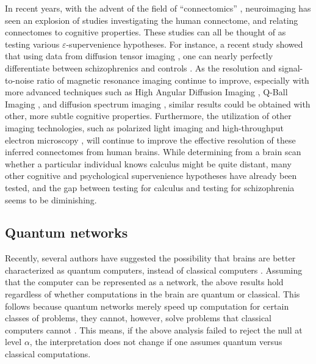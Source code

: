 \documentclass{article}
\newcommand{\eps}{\varepsilon}
\begin{document}
In recent years, with the advent of the field of ``connectomics'' \cite{SpornsKotter05,Hagmann05}, neuroimaging has seen an explosion of studies investigating the human connectome, and relating connectomes to cognitive properties. %
These studies can all be thought of as testing various $\eps$-supervenience hypotheses.  For instance, a recent study showed that using data from diffusion tensor imaging \cite{Basser94}, one can nearly perfectly differentiate between schizophrenics and controls \cite{ArdekaniSzeszko10}.  As the resolution and signal-to-noise ratio of magnetic resonance imaging continue to improve, especially with more advanced techniques such as High Angular Diffusion Imaging \cite{TuchWedeen02}, Q-Ball Imaging \cite{Tuch04}, and diffusion spectrum imaging \cite{WedeenWeisskoff05}, similar results could be obtained with other, more subtle cognitive properties.  Furthermore, the utilization of other imaging technologies, such as polarized light imaging \cite{PalmAmunts10} and high-throughput electron microscopy \cite{DenkHorstmann04,HayworthLichtman06}, will continue to improve the effective resolution of these inferred connectomes from human brains. While determining from a brain scan whether a particular individual knows calculus might be quite distant, many other cognitive and psychological supervenience hypotheses have already been tested, and the gap between testing for calculus and testing for schizophrenia seems to be diminishing.





\subsection{Quantum networks} %
\label{par:quantum_networks}

Recently, several authors have suggested the possibility that brains are better characterized as quantum computers, instead of classical computers \cite{Penrose99,Satinover02}.  Assuming that the computer can be represented as a network, the above results hold regardless of whether computations in the brain are quantum or classical.  This follows because quantum networks merely speed up computation for certain classes of problems, they cannot, however, solve problems that classical computers cannot \cite{NielsenChuang00}.  This means, if the above analysis failed to reject the null at level $\alpha$, the interpretation does not change if one assumes quantum versus classical computations.
\end{document}
